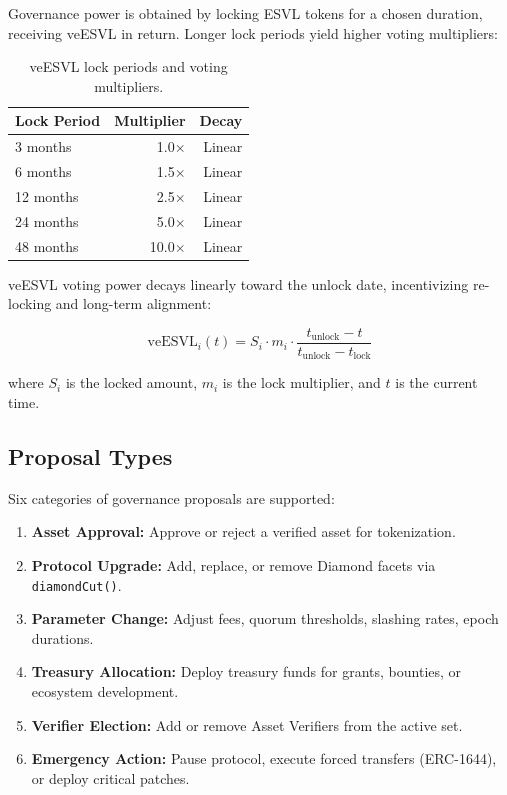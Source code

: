 \documentclass[11pt,a4paper]{article}
\begin{document}
Governance power is obtained by locking ESVL tokens for a chosen duration, receiving veESVL in return. Longer lock periods yield higher voting multipliers:

\begin{table}[H]
\centering
\caption{veESVL lock periods and voting multipliers.}
\label{tab:vesvl}
\begin{tabular}{lrr}
\toprule
\textbf{Lock Period} & \textbf{Multiplier} & \textbf{Decay} \\
\midrule
3 months & 1.0$\times$ & Linear \\
6 months & 1.5$\times$ & Linear \\
12 months & 2.5$\times$ & Linear \\
24 months & 5.0$\times$ & Linear \\
48 months & 10.0$\times$ & Linear \\
\bottomrule
\end{tabular}
\end{table}

veESVL voting power decays linearly toward the unlock date, incentivizing re-locking and long-term alignment:

\begin{equation}
    \text{veESVL}_i(t) = S_i \cdot m_i \cdot \frac{t_{\text{unlock}} - t}{t_{\text{unlock}} - t_{\text{lock}}}
\end{equation}

\noindent where $S_i$ is the locked amount, $m_i$ is the lock multiplier, and $t$ is the current time.

\subsection{Proposal Types}

Six categories of governance proposals are supported:

\begin{enumerate}[nosep]
    \item \textbf{Asset Approval:} Approve or reject a verified asset for tokenization.
    \item \textbf{Protocol Upgrade:} Add, replace, or remove Diamond facets via \texttt{diamondCut()}.
    \item \textbf{Parameter Change:} Adjust fees, quorum thresholds, slashing rates, epoch durations.
    \item \textbf{Treasury Allocation:} Deploy treasury funds for grants, bounties, or ecosystem development.
    \item \textbf{Verifier Election:} Add or remove Asset Verifiers from the active set.
    \item \textbf{Emergency Action:} Pause protocol, execute forced transfers (ERC-1644), or deploy critical patches.
\end{enumerate}
\end{document}
